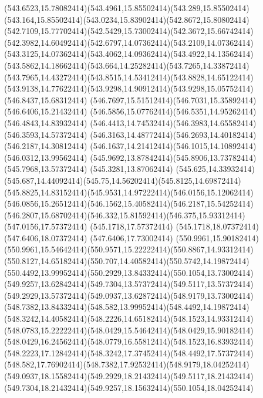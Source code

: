 {{	\curveto(543.6523,15.78082414)(543.4961,15.85502414)(543.289,15.85502414)
	\curveto(543.164,15.85502414)(543.0234,15.83902414)(542.8672,15.80802414)
	\curveto(542.7109,15.77702414)(542.5429,15.73002414)(542.3672,15.66742414)
	\curveto(542.3982,14.60492414)(542.6797,14.07362414)(543.2109,14.07362414)
	\curveto(543.3125,14.07362414)(543.4062,14.09362414)(543.4922,14.13562414)
	\curveto(543.5862,14.18662414)(543.664,14.25282414)(543.7265,14.33872414)
	\curveto(543.7965,14.43272414)(543.8515,14.53412414)(543.8828,14.65122414)
	\curveto(543.9138,14.77622414)(543.9298,14.90912414)(543.9298,15.05752414)
	\closepath
	\moveto(546.8437,15.68312414)
	\curveto(546.7697,15.51512414)(546.7031,15.35892414)(546.6406,15.21432414)
	\curveto(546.5856,15.07762414)(546.5351,14.95262414)(546.4843,14.83932414)
	\curveto(546.4413,14.74532414)(546.3983,14.65582414)(546.3593,14.57372414)
	\curveto(546.3163,14.48772414)(546.2693,14.40182414)(546.2187,14.30812414)
	\curveto(546.1637,14.21412414)(546.1015,14.10892414)(546.0312,13.99562414)
	\curveto(545.9692,13.87842414)(545.8906,13.73782414)(545.7968,13.57372414)
	\lineto(545.3281,13.87062414)
	\lineto(545.625,14.33932414)
	\curveto(545.687,14.44092414)(545.75,14.56202414)(545.8125,14.69872414)
	\curveto(545.8825,14.83152414)(545.9531,14.97222414)(546.0156,15.12062414)
	\curveto(546.0856,15.26512414)(546.1562,15.40582414)(546.2187,15.54252414)
	\curveto(546.2807,15.68702414)(546.332,15.81592414)(546.375,15.93312414)
	\lineto(547.0156,17.57372414)
	\lineto(545.1718,17.57372414)
	\lineto(545.1718,18.07372414)
	\lineto(547.6406,18.07372414)
	\lineto(547.6406,17.73002414)
	\closepath
	\moveto(550.9961,15.90182414)
	\curveto(550.9961,15.54642414)(550.9571,15.22222414)(550.8867,14.93312414)
	\curveto(550.8127,14.65182414)(550.707,14.40582414)(550.5742,14.19872414)
	\curveto(550.4492,13.99952414)(550.2929,13.84332414)(550.1054,13.73002414)
	\curveto(549.9257,13.62842414)(549.7304,13.57372414)(549.5117,13.57372414)
	\curveto(549.2929,13.57372414)(549.0937,13.62872414)(548.9179,13.73002414)
	\curveto(548.7382,13.84332414)(548.582,13.99952414)(548.4492,14.19872414)
	\curveto(548.3242,14.40582414)(548.2226,14.65182414)(548.1523,14.93312414)
	\curveto(548.0783,15.22222414)(548.0429,15.54642414)(548.0429,15.90182414)
	\curveto(548.0429,16.24562414)(548.0779,16.55812414)(548.1523,16.83932414)
	\curveto(548.2223,17.12842414)(548.3242,17.37452414)(548.4492,17.57372414)
	\curveto(548.582,17.76902414)(548.7382,17.92532414)(548.9179,18.04252414)
	\curveto(549.0937,18.15582414)(549.2929,18.21432414)(549.5117,18.21432414)
	\curveto(549.7304,18.21432414)(549.9257,18.15632414)(550.1054,18.04252414)
}}
